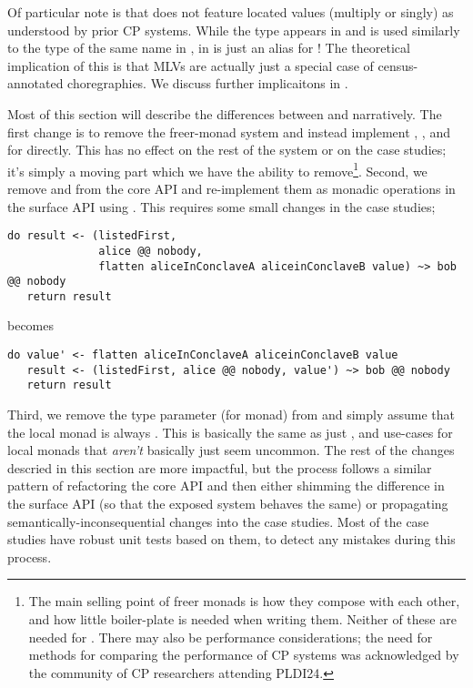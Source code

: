 Of particular note is that \minichor does not feature located values (multiply or singly) as understood by prior CP systems.
While the type  appears in \minichor and is used similarly to the type of the same name in \MultiChor,
in \minichor {} is just an alias for !
The theoretical implication of this is that MLVs are actually just a special case of census-annotated choregraphies.
We discuss further implicaitons in .

Most of this section will describe the differences between \MultiChor and \minichor narratively.
The first change is to remove the freer-monad system and instead implement , , and 
for  directly.
This has no effect on the rest of the system or on the case studies;
it's simply a moving part which we have the ability to remove\footnote{
	The main selling point of freer monads is how they compose with each other,
	and how little boiler-plate is needed when writing them.
	Neither of these are needed for \minichor.
	There may also be performance considerations;
	the need for methods for comparing the performance of CP systems was acknowledged by the community
  of CP researchers attending PLDI24.
	}.
Second, we remove  and  from the core API and re-implement them as
monadic operations in the surface API using .
This requires some small changes in the case studies; \eg
\begin{verbatim}
do result <- (listedFirst,
              alice @@ nobody,
              flatten aliceInConclaveA aliceinConclaveB value) ~> bob @@ nobody
   return result
\end{verbatim}
becomes
\begin{verbatim}
do value' <- flatten aliceInConclaveA aliceinConclaveB value
   result <- (listedFirst, alice @@ nobody, value') ~> bob @@ nobody
   return result
\end{verbatim}
Third, we remove the type parameter  (for monad) from 
and simply assume that the local monad is always .
This is basically the same as just , and use-cases for local monads that \emph{aren't} basically just 
seem uncommon.
The rest of the changes descried in this section are more impactful,
but the process follows a similar pattern of refactoring the core API and then either shimming the difference in the surface API
(so that the exposed system behaves the same)
or propagating semantically-inconsequential changes into the case studies.
Most of the case studies have robust unit tests based on them, to detect any mistakes during this process.

